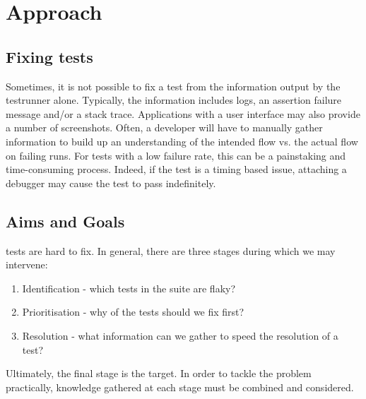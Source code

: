 \section{Approach}
\label{sec:approach}


\subsection{Fixing \flaky{} tests}


Sometimes, it is not possible to fix a \flaky{} test from the information output by the testrunner alone. Typically, the information includes logs, an assertion failure message and/or a stack trace. Applications with a user interface may also provide a number of screenshots. Often, a developer will have to manually gather information to build up an understanding of the intended flow vs. the actual flow on failing runs. For \flaky{} tests with a low failure rate, this can be a painstaking and time-consuming process. Indeed, if the \flaky{} test is a timing based issue, attaching a debugger may cause the test to pass indefinitely.



\subsection{Aims and Goals}

\flaky{} tests are hard to fix. In general, there are three stages during which we may intervene:
\begin{enumerate}
	\item Identification - which tests in the suite are flaky?
	\item Prioritisation - why of the \flaky{} tests should we fix first?
	\item Resolution - what information can we gather to speed the resolution of a test?
\end{enumerate}

Ultimately, the final stage is the target. In order to tackle the problem practically, knowledge gathered at each stage must be combined and considered.

